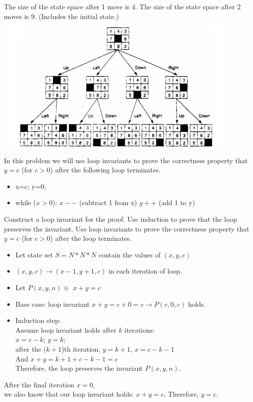 \documentclass[solution, letterpaper]{cs20inclass}
\begin{document}
\begin{solution}
\subsolution The size of the state space after 1 move is 4.
\subsolution The size of the state space after 2 moves is 9. (Includes the initial state.)\\
\includegraphics[width=12cm]{final8}
\end{solution}

\problem In this problem we will use loop invariants to prove the correctness property that $y=c$ (for $c>0$) after the following loop terminates.
\begin{itemize}
\item x=c; y=0;
\item while ($x>0$):
\subitem $x--$ (subtract 1 from x)
\subitem $y++$ (add 1 to y)
\end{itemize}
\subproblem Construct a loop invariant for the proof.
\subproblem Use induction to prove that the loop preserves the invariant.
\subproblem Use loop invariants to prove the correctness property that $y=c$ (for $c>0$) after the loop terminates.

\begin{solution}
\subsolution
\begin{itemize}
\item Let state set $S=N*N*N$ contain the values of $(x, y, c)$
\item $(x,y,c) \rightarrow (x-1, y+1, c)$  in each iteration of loop.
\item Let $P(x,y,n)\equiv$ $x+y=c$ 
\end{itemize}
\subsolution
\begin{itemize}
\item Base case: loop invariant $x+y=c+0=c \rightarrow P(c,0,c)$ holds.
\item Induction step: \\
Assume loop invariant holds after $k$ iterations:\\
$x=c-k$; $y=k$;\\
after the ($k+1$)th iteration, $y=k+1$, $x=c-k-1$\\
And $x+y=k+1+c-k-1=c$\\
Therefore, the loop preserves the invariant $P(x,y,n)$.
\end{itemize}
\subsolution
After the final iteration $x=0$,\\
we also know that our loop invariant holds: $x+y=c$. Therefore, $y=c$.
\end{solution}
\end{document}
